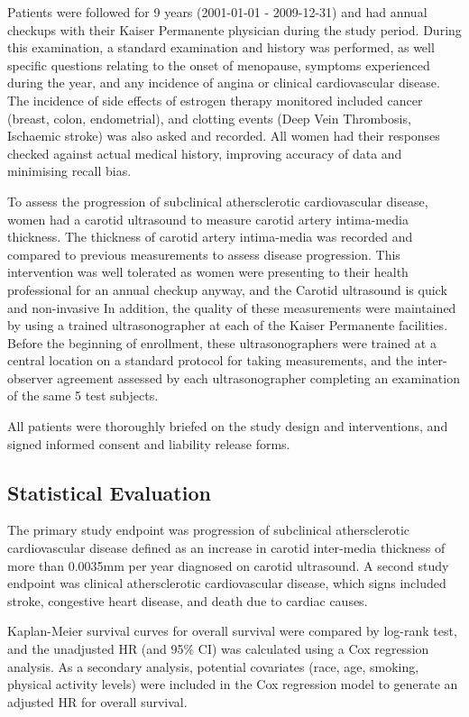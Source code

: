 \documentclass[11pt]{article}
\begin{document}
		
		Patients were followed for 9 years (2001-01-01 - 2009-12-31) and had annual checkups with their Kaiser Permanente physician during the study period.
		During this examination, a standard examination and history was performed, as well specific questions relating to the onset of menopause, symptoms experienced during the year, and any incidence of angina or clinical cardiovascular disease.
		The incidence of side effects of estrogen therapy monitored included cancer (breast, colon, endometrial), and clotting events (Deep Vein Thrombosis, Ischaemic stroke) was also asked and recorded.
		All women had their responses checked against actual medical history, improving accuracy of data and minimising recall bias.


		To assess the progression of subclinical athersclerotic cardiovascular disease, women had a carotid ultrasound to measure carotid artery intima-media thickness.
		The thickness of carotid artery intima-media was recorded and compared to previous measurements to assess disease progression.
		This intervention was well tolerated as women were presenting to their health professional for an annual checkup anyway, and the Carotid ultrasound is quick and non-invasive
		In addition, the quality of these measurements were maintained by using a trained ultrasonographer at each of the Kaiser Permanente facilities.
		Before the beginning of enrollment, these ultrasonographers were trained at a central location on a standard protocol for taking measurements, and the inter-observer agreement assessed by each ultrasonographer completing an examination of the same 5 test subjects.


		All patients were thoroughly briefed on the study design and interventions, and signed informed consent and liability release forms.


	\subsection{Statistical Evaluation}
		The primary study endpoint was progression of subclinical athersclerotic cardiovascular disease defined as an increase in carotid inter-media thickness of more than 0.0035mm per year diagnosed on carotid ultrasound.
		A second study endpoint was clinical athersclerotic cardiovascular disease, which signs included stroke, congestive heart disease, and death due to cardiac causes.


		Kaplan-Meier survival curves for overall survival were compared by log-rank test, and the unadjusted HR (and 95\% CI) was calculated using a Cox regression analysis.
		As a secondary analysis, potential covariates (race, age, smoking, physical activity levels) were included in the Cox regression model to generate an adjusted HR for overall survival.
\end{document}
